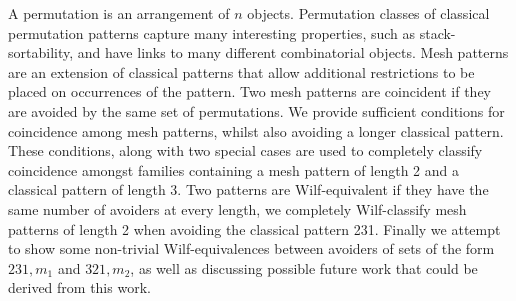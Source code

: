 A permutation is an arrangement of \(n\) objects.
Permutation classes of classical permutation patterns
capture many interesting properties, such as
stack-sortability, and have links to many different combinatorial objects.
Mesh patterns are an extension of classical patterns that allow additional
restrictions to be placed on occurrences of the pattern.
Two mesh patterns are coincident if they are avoided by the same set of
permutations. We provide sufficient conditions for
coincidence among mesh patterns, whilst also avoiding a longer classical
pattern. These conditions, along with two special cases are used to completely
classify coincidence amongst families containing a mesh pattern of length 2
and a classical pattern of length 3. Two patterns are Wilf-equivalent if they
have the same number of avoiders at every length, we completely
Wilf-classify mesh patterns of length 2 when avoiding the classical pattern 231.
Finally we attempt to show some non-trivial Wilf-equivalences between avoiders
of sets of the form \(231,m_1\) and \(321,m_2\), as well as discussing possible
future work that could be derived from this work.
